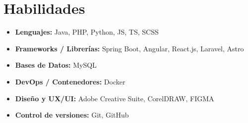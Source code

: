 \documentclass[11pt,a4paper]{article}
\begin{document}
\section*{Habilidades}
\begin{itemize}
  \item \textbf{Lenguajes:} Java, PHP, Python, JS, TS, SCSS
  \item \textbf{Frameworks / Librerías:} Spring Boot, Angular, React.js, Laravel, Astro
  \item \textbf{Bases de Datos:} MySQL
  \item \textbf{DevOps / Contenedores:} Docker
  \item \textbf{Diseño y UX/UI:} Adobe Creative Suite, CorelDRAW, FIGMA
  \item \textbf{Control de versiones:} Git, GitHub
\end{itemize}
\end{document}
